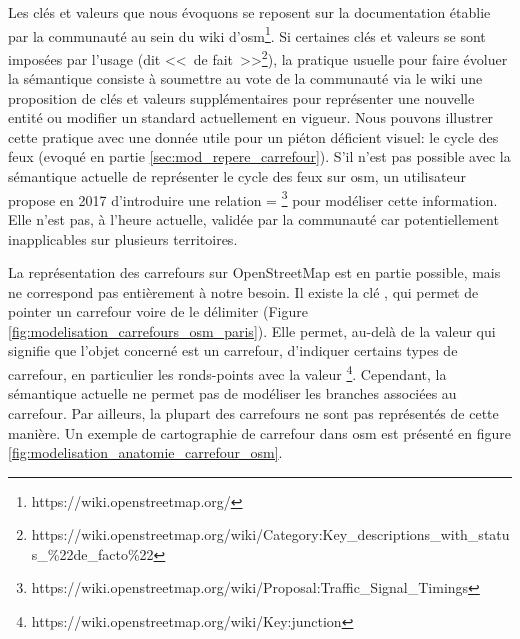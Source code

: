 \newpar{}


Les clés et valeurs que nous évoquons se reposent sur la documentation établie par la communauté au sein du wiki d'\gls{osm}\footnote{https://wiki.openstreetmap.org/}. Si certaines clés et valeurs se sont imposées par l'usage (dit <<~de fait~>>\footnote{https://wiki.openstreetmap.org/wiki/Category:Key\_descriptions\_with\_status\_\%22de\_facto\%22}), la pratique usuelle pour faire évoluer la sémantique consiste à soumettre au vote de la communauté via le wiki une proposition de clés et valeurs supplémentaires pour représenter une nouvelle entité ou modifier un standard actuellement en vigueur. Nous pouvons illustrer cette pratique avec une donnée utile pour un piéton déficient visuel: le cycle des feux (evoqué en partie \ref{sec:mod_repere_carrefour}). S'il n'est pas possible avec la sémantique actuelle de représenter le cycle des feux sur \gls{osm}, un utilisateur propose en 2017 d'introduire une relation = \footnote{https://wiki.openstreetmap.org/wiki/Proposal:Traffic\_Signal\_Timings} pour modéliser cette information. Elle n'est pas, à l'heure actuelle, validée par la communauté car potentiellement inapplicables sur plusieurs territoires.

\newpar{}


La représentation des carrefours sur OpenStreetMap est en partie possible, mais ne correspond pas entièrement à notre besoin. Il existe la clé , qui permet de pointer un carrefour voire de le délimiter (Figure \ref{fig:modelisation_carrefours_osm_paris}). Elle permet, au-delà de la valeur  qui signifie que l'objet concerné est un carrefour, d'indiquer certains types de carrefour, en particulier les ronds-points avec la valeur \footnote{https://wiki.openstreetmap.org/wiki/Key:junction}. Cependant, la sémantique actuelle ne permet pas de modéliser les branches associées au carrefour. Par ailleurs, la plupart des carrefours ne sont pas représentés de cette manière. Un exemple de cartographie de carrefour dans \gls{osm} est présenté en figure \ref{fig:modelisation_anatomie_carrefour_osm}.

